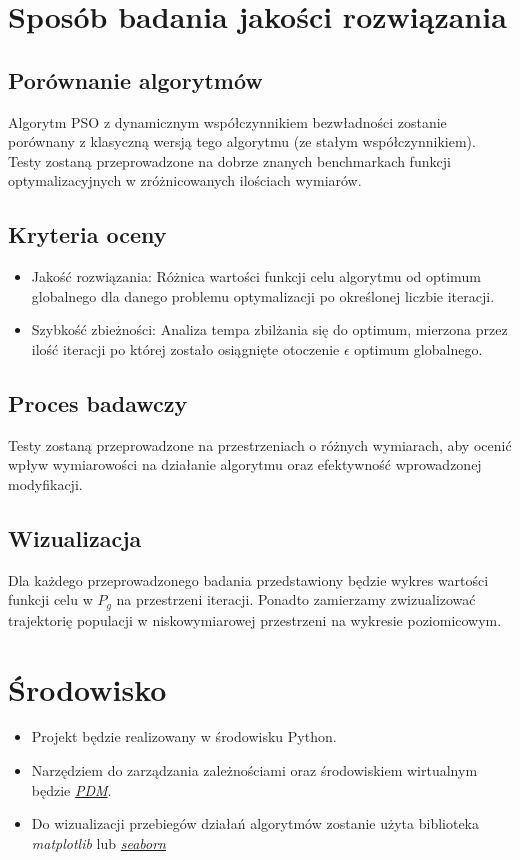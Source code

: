 \documentclass[12pt]{article}
\begin{document}
\section{Sposób badania jakości rozwiązania}

\subsection*{Porównanie algorytmów}
Algorytm PSO z dynamicznym współczynnikiem bezwładności zostanie porównany z klasyczną wersją tego algorytmu (ze stałym współczynnikiem).
Testy zostaną przeprowadzone na dobrze znanych benchmarkach funkcji optymalizacyjnych w zróżnicowanych ilościach wymiarów.

\subsection*{Kryteria oceny}
\begin{itemize}
	\item{Jakość rozwiązania: Różnica wartości funkcji celu algorytmu od optimum globalnego dla danego problemu optymalizacji po określonej liczbie iteracji.}

	\item{Szybkość zbieżności: Analiza tempa zbilżania się do optimum, mierzona przez ilość iteracji po której zostało osiągnięte otoczenie $\epsilon$ optimum globalnego.}
\end{itemize}

\subsection*{Proces badawczy}
Testy zostaną przeprowadzone na przestrzeniach o różnych wymiarach, aby ocenić wpływ wymiarowości na działanie algorytmu oraz
efektywność wprowadzonej modyfikacji.

\subsection*{Wizualizacja}
Dla każdego przeprowadzonego badania przedstawiony będzie wykres wartości funkcji celu w \(P_g\) na przestrzeni iteracji.
Ponadto zamierzamy zwizualizować trajektorię populacji w niskowymiarowej przestrzeni na wykresie poziomicowym.

\section{Środowisko}
\begin{itemize}
	\item{Projekt będzie realizowany w środowisku Python.}
	\item{Narzędziem do zarządzania zależnościami oraz środowiskiem wirtualnym będzie \href{https://pdm-project.org/latest/PDM}{\textit{PDM}}.}
	\item{Do wizualizacji przebiegów działań algorytmów zostanie użyta biblioteka \textit{matplotlib} lub \href{https://seaborn.pydata.org/}{\textit{seaborn}}}


\end{itemize}
\end{document}
